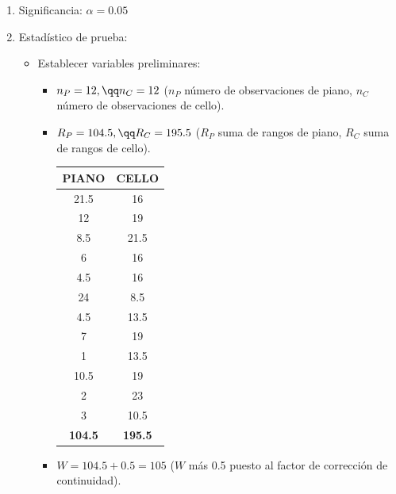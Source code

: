\begin{enumerate}
    \item Significancia: $\alpha = 0.05$ 
    \item Estadístico de prueba: 
        \begin{itemize}
            \item Establecer variables preliminares: 
                \begin{itemize}
                    \item $n_P = 12, \qq  n_C = 12$ ($n_P$ número de observaciones de piano, $n_C$ número de observaciones de cello).
                    \item $R_P = 104.5, \qq R_C = 195.5$ ($R_P$ suma de rangos de piano, $R_C$ suma de rangos de cello).
                        \begin{center}
                            \begin{tabular}{ |cc| }
                                \hline
                                PIANO & CELLO \\ 
                                \hline
                                21.5 & 16 \\
                                12 & 19 \\
                                8.5 & 21.5 \\
                                6 & 16 \\
                                4.5 & 16 \\
                                24 & 8.5 \\
                                4.5 & 13.5 \\
                                7 & 19 \\
                                1 & 13.5 \\
                                10.5 & 19 \\
                                2 & 23 \\
                                3 & 10.5 \\
                                \textbf{104.5} & \textbf{195.5} \\ 
                                \hline
                            \end{tabular}
                        \end{center}
                    \item $W = 104.5 + 0.5 = 105$ ($W$ más 0.5 puesto al factor de corrección de continuidad).
                \end{itemize}
            

\end{itemize}
\end{enumerate}
